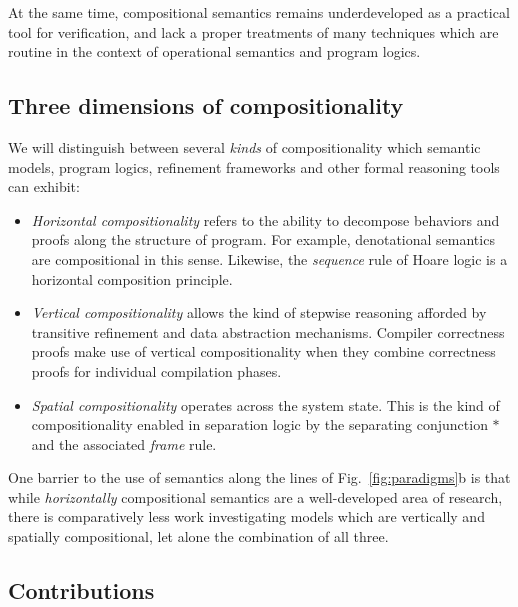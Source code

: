 \documentclass[acmsmall,screen,review,nonacm]{acmart}
\begin{document}
At the same time,
compositional semantics remains
underdeveloped as a practical tool for verification,
and lack a proper treatments of
many techniques which are routine in the context of
operational semantics and program logics.


\subsection{Three dimensions of compositionality} %

We will distinguish between several \emph{kinds} of compositionality which
semantic models, program logics, refinement frameworks
and other formal reasoning tools
can exhibit:
\begin{itemize}
\item \emph{Horizontal compositionality}
  refers to the ability to decompose behaviors and proofs
  along the structure of program.
  For example, denotational semantics are compositional in this sense.
  Likewise,
  the \emph{sequence} rule of Hoare logic
  is a horizontal composition principle.
\item \emph{Vertical compositionality} allows
  the kind of stepwise reasoning afforded by
  transitive refinement and data abstraction mechanisms.
  Compiler correctness proofs make use of vertical compositionality
  when they combine correctness proofs for individual compilation phases.
\item \emph{Spatial compositionality} operates across the system state.
  This is the kind of compositionality enabled in separation logic
  by the separating conjunction $\ast$
  and the associated \emph{frame} rule.
\end{itemize}
One barrier to the use of semantics
along the lines of Fig.~\ref{fig:paradigms}b
is that while
\emph{horizontally} compositional semantics
are a well-developed area of research,
there is comparatively less work investigating models which are
vertically and spatially compositional,
let alone the combination of all three.


\subsection{Contributions} %
\end{document}
